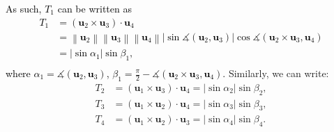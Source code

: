 \documentclass[journal]{IEEEtran}
\newcommand{\norm}[1]{\left\lVert#1\right\rVert}
\begin{document}
\textcolor{black}{
As such, $T_1$ can be written as
\begin{equation} \label{eq:det_Lambda_T4}
\begin{aligned}
    T_1 &= 
    (\mathbf{u}_2 \times \mathbf{u}_3) 
    \cdot 
    \mathbf{u}_4 \\
    &= 
    \norm{\mathbf{u}_2} 
    \norm{\mathbf{u}_3} 
    \norm{\mathbf{u}_4} 
    \left| \sin{\measuredangle (\mathbf{u}_2, \mathbf{u}_3)} \right| 
    \cos{\measuredangle (\mathbf{u}_2 \times \mathbf{u}_3, \mathbf{u}_4)}\\
    &= \left| \sin{\alpha_1} \right| \sin{\beta_1}, \\
\end{aligned}
\end{equation}
where 
$\alpha_1 = \measuredangle (\mathbf{u}_2, \mathbf{u}_3)$,
$\beta_1 = \frac{\pi}{2} - \measuredangle (\mathbf{u}_2 \times \mathbf{u}_3, \mathbf{u}_4)$.}
Similarly, we can write:
\begin{equation} \label{eq:det_Lambda_T123}
\begin{aligned}
    T_2 &= (\mathbf{u}_1 \times \mathbf{u}_3) \cdot \mathbf{u}_4 
    = \left| \sin{\alpha_2} \right| \sin{\beta_2}, \\
    T_3 &= (\mathbf{u}_1 \times \mathbf{u}_2) \cdot \mathbf{u}_4 
    = \left| \sin{\alpha_3} \right| \sin{\beta_3}, \\
    T_4 &= (\mathbf{u}_1 \times \mathbf{u}_2) 
    \cdot \mathbf{u}_3
    = \left| \sin{\alpha_4} \right| \sin{\beta_4}.\\
\end{aligned}
\end{equation}
\end{document}
